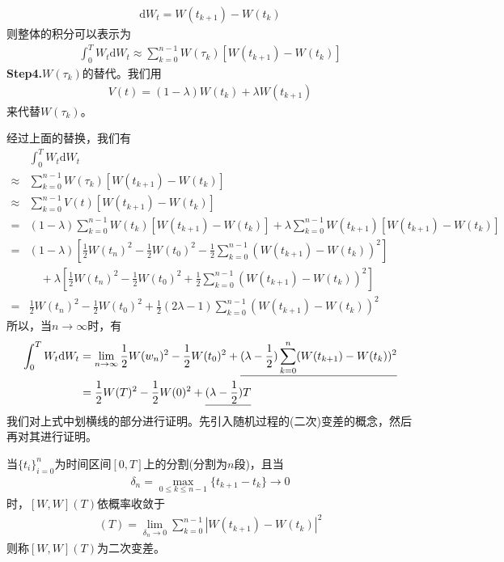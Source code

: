         \begin{align*}
            \mathrm{d}W_t = W(t_{k+1}) - W(t_k)
        \end{align*}
        则整体的积分可以表示为
        \begin{align*}
            \int_0 ^T W_t \mathrm{d}W_t \approx \sum_{k = 0}^{n - 1}W(\tau_k) [W(t_{k+1}) - W(t_k)]
        \end{align*}
        \textbf{Step4.}$W(\tau_k)$的替代。我们用
        \begin{align*}
        V(t) = (1- \lambda)W(t_k) + \lambda W(t_{k+1})
        \end{align*}
        来代替$W(\tau_k)$。
        \par
        经过上面的替换，我们有
        \begin{align*}
                    &\int_0 ^T W_t \mathrm{d}W_t  \\
            \approx {} &\sum_{k = 0}^{n - 1}W(\tau_k) [W(t_{k+1}) - W(t_k)] \\
            \approx {} &\sum_{k = 0}^{n - 1}V(t) [W(t_{k+1}) - W(t_k)] \\
            =       {} &(1- \lambda)\sum_{k = 0}^{n - 1} W(t_k) [W(t_{k+1}) - W(t_k)]
                    + \lambda \sum_{k = 0}^{n - 1} W(t_{k+1}) [W(t_{k+1}) - W(t_k)] \\
            =       {} &(1- \lambda) \left[ \frac{1}{2} W(t_n)^2 - \frac{1}{2} W(t_0)^2 - \frac{1}{2} \sum_{k = 0}^{n-1}(W(t_{k+1}) - W(t_k))^2 \right] \\
            & \quad + \lambda \left[ \frac{1}{2} W(t_n)^2 - \frac{1}{2} W(t_0)^2 + \frac{1}{2} \sum_{k = 0}^{n-1}(W(t_{k+1}) - W(t_k))^2 \right]\\
            =       {} &\frac{1}{2}W(t_n)^2 - \frac{1}{2}W(t_0)^2 + \frac{1}{2} (2\lambda -1) \sum_{k = 0}^{n - 1} (W(t_{k+1}) - W(t_k))^2
        \end{align*}
        所以，当$n\rightarrow \infty$时，有
        \begin{align}
            \label{随机积分试探}
            \int_0 ^T W_t \mathrm{d}W_t &= \lim_{n\rightarrow \infty} \frac{1}{2} W(w_n)^2 - \frac{1}{2}W(t_0)^2 + \underline{(\lambda -\frac{1}{2}) \sum_{k = 0}^{n} (W(t_{k+1}) - W(t_k))^2} \notag\\
            &=\frac{1}{2} W(T)^2 - \frac{1}{2}W(0)^2 + \underline{(\lambda -\frac{1}{2})T}
        \end{align}
        我们对上式中划横线的部分进行证明。先引入随机过程的(二次)变差的概念，然后再对其进行证明。
        \begin{definition}[二次变差]
        当$\{t_i\}_{i = 0}^n$为时间区间$[0,T]$上的分割(分割为$n$段)，且当
        \begin{align*}
            \delta_n = \max_{0 \leqslant k \leqslant n-1} \{t_{k+1} - t_k\} \rightarrow 0
        \end{align*}
        时，$[W,W](T)$依概率收敛于
        \begin{align*}
            [W,W](T) = \lim_{\delta_n \rightarrow 0} \sum_{k = 0}^{n - 1} |W(t_{k+1}) - W(t_k)|^2
        \end{align*}
        则称$[W,W](T)$为二次变差。
        \end{definition}
